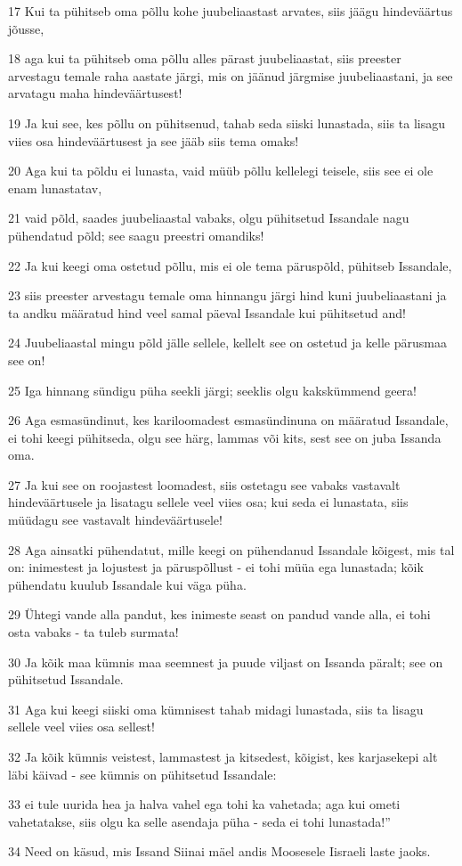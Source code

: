 \par 17 Kui ta pühitseb oma põllu kohe juubeliaastast arvates, siis jäägu hindeväärtus jõusse,
\par 18 aga kui ta pühitseb oma põllu alles pärast juubeliaastat, siis preester arvestagu temale raha aastate järgi, mis on jäänud järgmise juubeliaastani, ja see arvatagu maha hindeväärtusest!
\par 19 Ja kui see, kes põllu on pühitsenud, tahab seda siiski lunastada, siis ta lisagu viies osa hindeväärtusest ja see jääb siis tema omaks!
\par 20 Aga kui ta põldu ei lunasta, vaid müüb põllu kellelegi teisele, siis see ei ole enam lunastatav,
\par 21 vaid põld, saades juubeliaastal vabaks, olgu pühitsetud Issandale nagu pühendatud põld; see saagu preestri omandiks!
\par 22 Ja kui keegi oma ostetud põllu, mis ei ole tema päruspõld, pühitseb Issandale,
\par 23 siis preester arvestagu temale oma hinnangu järgi hind kuni juubeliaastani ja ta andku määratud hind veel samal päeval Issandale kui pühitsetud and!
\par 24 Juubeliaastal mingu põld jälle sellele, kellelt see on ostetud ja kelle pärusmaa see on!
\par 25 Iga hinnang sündigu püha seekli järgi; seeklis olgu kakskümmend geera!
\par 26 Aga esmasündinut, kes kariloomadest esmasündinuna on määratud Issandale, ei tohi keegi pühitseda, olgu see härg, lammas või kits, sest see on juba Issanda oma.
\par 27 Ja kui see on roojastest loomadest, siis ostetagu see vabaks vastavalt hindeväärtusele ja lisatagu sellele veel viies osa; kui seda ei lunastata, siis müüdagu see vastavalt hindeväärtusele!
\par 28 Aga ainsatki pühendatut, mille keegi on pühendanud Issandale kõigest, mis tal on: inimestest ja lojustest ja päruspõllust - ei tohi müüa ega lunastada; kõik pühendatu kuulub Issandale kui väga püha.
\par 29 Ühtegi vande alla pandut, kes inimeste seast on pandud vande alla, ei tohi osta vabaks - ta tuleb surmata!
\par 30 Ja kõik maa kümnis maa seemnest ja puude viljast on Issanda päralt; see on pühitsetud Issandale.
\par 31 Aga kui keegi siiski oma kümnisest tahab midagi lunastada, siis ta lisagu sellele veel viies osa sellest!
\par 32 Ja kõik kümnis veistest, lammastest ja kitsedest, kõigist, kes karjasekepi alt läbi käivad - see kümnis on pühitsetud Issandale:
\par 33 ei tule uurida hea ja halva vahel ega tohi ka vahetada; aga kui ometi vahetatakse, siis olgu ka selle asendaja püha - seda ei tohi lunastada!”
\par 34 Need on käsud, mis Issand Siinai mäel andis Moosesele Iisraeli laste jaoks.



